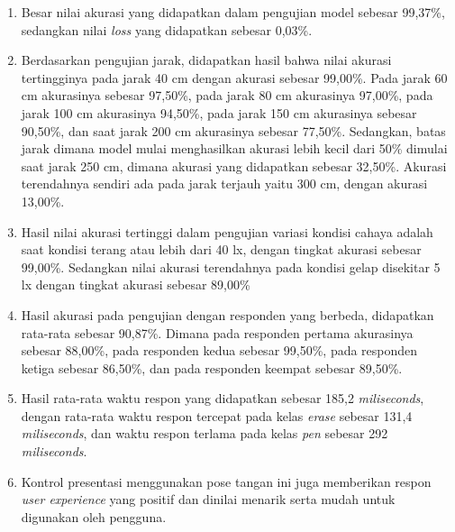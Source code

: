 \begin{enumerate}[nolistsep]
  \item Besar nilai akurasi yang didapatkan dalam pengujian model sebesar 99,37\%, sedangkan nilai \emph{loss} yang didapatkan sebesar 0,03\%.
  \item Berdasarkan pengujian jarak, didapatkan hasil bahwa nilai akurasi tertingginya pada jarak 40 cm dengan akurasi sebesar 99,00\%. Pada jarak 60 cm akurasinya sebesar 97,50\%, pada jarak 80 cm akurasinya 97,00\%, pada jarak 100 cm akurasinya 94,50\%, pada jarak 150 cm akurasinya sebesar 90,50\%, dan saat jarak 200 cm akurasinya sebesar 77,50\%. Sedangkan, batas jarak dimana model mulai menghasilkan akurasi lebih kecil dari 50\% dimulai saat jarak 250 cm, dimana akurasi yang didapatkan sebesar 32,50\%. Akurasi terendahnya sendiri ada pada jarak terjauh yaitu 300 cm, dengan akurasi 13,00\%.
  \item Hasil nilai akurasi tertinggi dalam pengujian variasi kondisi cahaya adalah saat kondisi terang atau lebih dari 40 lx, dengan tingkat akurasi sebesar 99,00\%. Sedangkan nilai akurasi terendahnya pada kondisi gelap disekitar 5 lx dengan tingkat akurasi sebesar 89,00\%
  \item Hasil akurasi pada pengujian dengan responden yang berbeda, didapatkan rata-rata sebesar 90,87\%. Dimana pada responden pertama akurasinya sebesar 88,00\%, pada responden kedua sebesar 99,50\%, pada responden ketiga sebesar 86,50\%, dan pada responden keempat sebesar 89,50\%.
  \item Hasil rata-rata waktu respon yang didapatkan sebesar 185,2 \emph{miliseconds}, dengan rata-rata waktu respon tercepat pada kelas \emph{erase} sebesar 131,4 \emph{miliseconds}, dan waktu respon terlama pada kelas \emph{pen} sebesar 292 \emph{miliseconds}. 
  \item Kontrol presentasi menggunakan pose tangan ini juga memberikan respon \emph{user experience} yang positif dan dinilai menarik serta mudah untuk digunakan oleh pengguna.


\end{enumerate}
